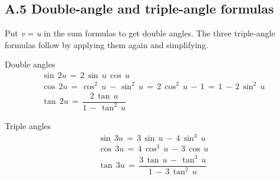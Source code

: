 \documentclass[11pt]{article}
\begin{document}
\begin{keepsection}
\section{A.5 Double-angle and triple-angle formulas}

Put \textit{v} = \textit{u} in the sum formulas to get double angles. The three triple-angle formulas follow by applying them again and simplifying.

\begin{equationcard}{Double angles}
\[ \begin{gathered} \sin \, 2{u}\, =\, 2\, \sin \, {u}\, \cos \, {u} \\ \cos \, 2{u}\, =\, \cos ^{2}\, {u}\, -\, \sin ^{2}\, {u}\, =\, 2\, \cos ^{2}\, {u}\, -\, 1\, =\, 1\, -\, 2\, \sin ^{2}\, {u} \\ \tan \, 2{u}\, =\, \dfrac{2\, \tan \, {u}}{1\, -\, \tan ^{2}\, {u}} \end{gathered} \]
\end{equationcard}

\begin{equationcard}{Triple angles}
\[ \begin{gathered} \sin \, 3{u}\, =\, 3\, \sin \, {u}\, -\, 4\, \sin ^{3}\, {u} \\ \cos \, 3{u}\, =\, 4\, \cos ^{3}\, {u}\, -\, 3\, \cos \, {u} \\ \tan \, 3{u}\, =\, \dfrac{3\, \tan \, {u}\, -\, \tan ^{3}\, {u}}{1\, -\, 3\, \tan ^{2}\, {u}} \end{gathered} \]
\end{equationcard}
\end{keepsection}
\end{document}
